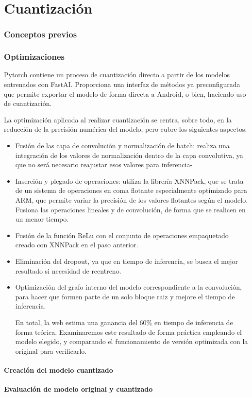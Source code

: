 \chapter{Cuantización}

\subsection{Conceptos previos}

\subsection{Optimizaciones}

Pytorch contiene un proceso de cuantización directo a partir de los modelos entrenados con FastAI. Proporciona una interfaz de métodos ya preconfigurada que permite exportar el modelo de forma directa a Android, o bien, haciendo uso de cuantización.

La optimización aplicada al realizar cuantización se centra, sobre todo, en la reducción de la precisión numérica del modelo, pero cubre los siguientes aspectos:

\begin{itemize}
	\item Fusión de las capa de convolución y normalización de batch: realiza una integración de los valores de normalización dentro de la capa convolutiva, ya que no será necesario reajustar esos valores para inferencia-
	\item Inserción y plegado de operaciones: utiliza la librería XNNPack, que se trata de un sistema de operaciones en coma flotante especialmente optimizado para ARM, que permite variar la precisión de los valores flotantes según el modelo. Fusiona las operaciones lineales y de convolución, de forma que se realicen en un menor tiempo.
	\item Fusión de la función ReLu con el conjunto de operaciones empaquetado creado con XNNPack en el paso anterior.
	\item Eliminación del dropout, ya que en tiempo de inferencia, se busca el mejor resultado si necesidad de reentreno.
	\item Optimización del grafo interno del modelo correspondiente a la convolución, para hacer que formen parte de un solo bloque raiz y mejore el tiempo de inferencia.
	
	En total, la web estima una ganancia del 60\% en tiempo de inferencia de forma teórica. Examinaremos este resultado de forma práctica empleando el modelo elegido, y comparando el funcionamiento de versión optimizada con la original para verificarlo.
	
\end{itemize}

\subsubsection{Creación del modelo cuantizado}
\subsubsection{Evaluación de modelo original y cuantizado}